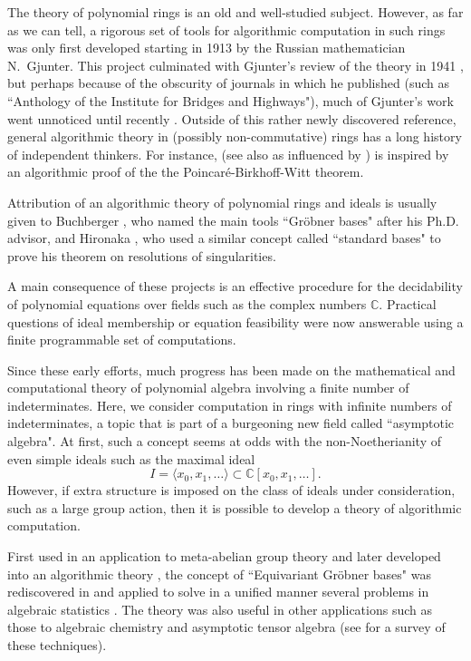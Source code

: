 
The theory of polynomial rings is an old and well-studied subject.  However, as far as we can tell, a rigorous set of tools for algorithmic computation in such rings was only first developed starting in 1913 \cite{gjunter1913} by the Russian mathematician N.~Gjunter.  This project culminated with Gjunter's review of the theory in 1941 \cite{gunther1941modules}, but perhaps because of the obscurity of journals in which he published (such as ``Anthology of the Institute for Bridges and Highways"), much of Gjunter's work went unnoticed until recently \cite{renschuch2003contributions}.  Outside of this rather newly discovered reference, general algorithmic theory in (possibly non-commutative) rings has a long history of independent thinkers.  For instance, \cite{bergman1978diamond} (see also \cite{bokut1976embeddings} as influenced by \cite{shirshov1962some}) is inspired by an algorithmic proof of the the Poincar\'e-Birkhoff-Witt theorem.  

Attribution of an algorithmic theory of polynomial rings and ideals is usually given to Buchberger \cite{buchberger1965algorithmus}, who named the main tools ``Gr\"obner bases" after his Ph.D. advisor, and Hironaka \cite{hironaka1964resolution}, who used a similar concept called ``standard bases" to prove his theorem on resolutions of singularities.  

A main consequence of these projects is an effective procedure for the decidability of polynomial equations over fields such as the complex numbers $\mathbb{C}$.  Practical questions of ideal membership or equation feasibility were now answerable using a finite programmable set of computations.  

Since these early efforts, much progress has been made on the mathematical and computational theory of polynomial algebra involving a finite number of indeterminates.  Here, we consider computation in rings with infinite numbers of indeterminates, a topic that is part of a burgeoning new field called ``asymptotic algebra".  At first, such a concept seems at odds with the non-Noetherianity of even simple ideals such as the maximal ideal \[I = \langle x_0, x_1, \ldots  \rangle \subset \mathbb C[x_0, x_1,\ldots].\]
However, if extra structure is imposed on the class of ideals under consideration, such as a large group action, then it is possible to develop a theory of algorithmic computation.  

First used in an application to meta-abelian group theory \cite{cohen1967laws} and later developed into an algorithmic theory \cite{Emmott, Cohen87}, the concept of ``Equivariant Gr\"obner bases" was rediscovered in \cite{aschenbrenner2007finite, aschenbrenner2008algorithm} and applied to solve in a unified manner several problems in algebraic statistics \cite{hillar2012finite}.  The theory was also useful in other applications such as those to algebraic chemistry \cite{Draisma08b} and asymptotic tensor algebra \cite{draisma2014bounded} (see \cite{draisma2014noetherianity} for a survey of these techniques).

